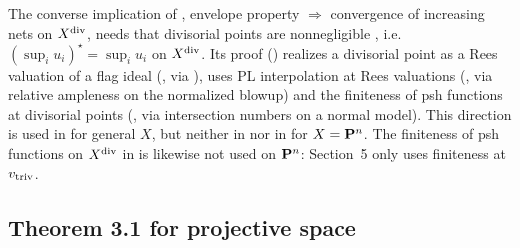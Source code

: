 \begin{remark}\label{rmk:bj-ep-criterion-converse}
The converse implication of \cite[Proposition~2.4]{FHX}, envelope property $\Rightarrow$ convergence of
increasing nets on $X^{\mathrm{div}}$, needs that divisorial points are nonnegligible \cite[Theorem~5.6]{BJ22},
i.e.\ $(\sup_iu_i)^\star=\sup_iu_i$ on $X^{\mathrm{div}}$. Its proof (\cite[Lemma~5.7]{BJ22}) realizes a divisorial
point as a Rees valuation of a flag ideal (\cite[Lemma~2.15]{BJ22}, via \cite[Lemma~1.20]{BJ22}), uses PL
interpolation at Rees valuations (\cite[Lemmas~2.18, 2.19]{BJ22}, via relative ampleness on the normalized
blowup) and the finiteness of psh functions at divisorial points (\cite[Proposition~1.28,
Corollary~4.17]{BJ22}, via intersection numbers on a normal model). This direction is used in
\cite[\S\S4, 6--8]{FHX} for general $X$, but neither in \cite[\S3]{FHX} nor in \cite[\S5]{FHX} for $X=\mathbf{P}^n$.
The finiteness of psh functions on $X^{\mathrm{div}}$ in \cite[Proposition~2.1(2)]{FHX} is likewise not used on
$\mathbf{P}^n$: Section~5 only uses finiteness at $v_{\mathrm{triv}}$.
\end{remark}

\subsection{Theorem 3.1 for projective space}

